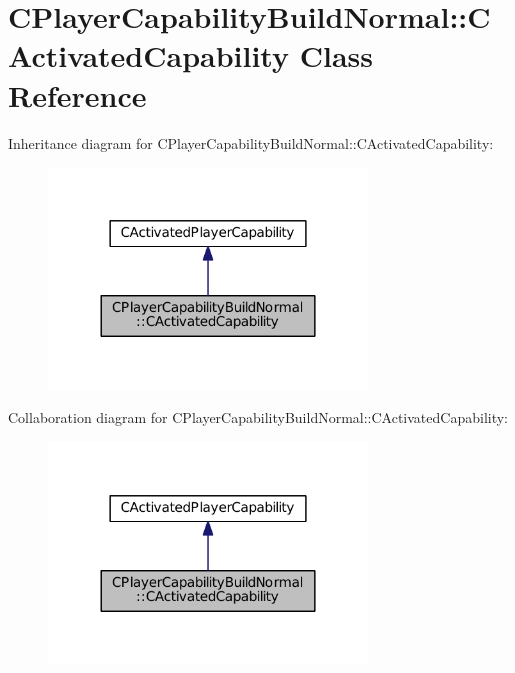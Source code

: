 \hypertarget{classCPlayerCapabilityBuildNormal_1_1CActivatedCapability}{}\section{C\+Player\+Capability\+Build\+Normal\+:\+:C\+Activated\+Capability Class Reference}
\label{classCPlayerCapabilityBuildNormal_1_1CActivatedCapability}


Inheritance diagram for C\+Player\+Capability\+Build\+Normal\+:\+:C\+Activated\+Capability\+:\nopagebreak
\begin{figure}[H]
\begin{center}
\leavevmode
\includegraphics[width=240pt]{classCPlayerCapabilityBuildNormal_1_1CActivatedCapability__inherit__graph}
\end{center}
\end{figure}


Collaboration diagram for C\+Player\+Capability\+Build\+Normal\+:\+:C\+Activated\+Capability\+:\nopagebreak
\begin{figure}[H]
\begin{center}
\leavevmode
\includegraphics[width=240pt]{classCPlayerCapabilityBuildNormal_1_1CActivatedCapability__coll__graph}
\end{center}
\end{figure}
